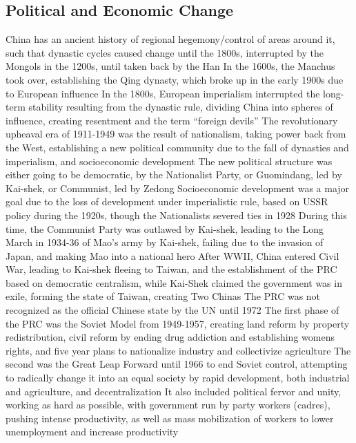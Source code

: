 \documentclass[11 pt, twoside]{article}
\newenvironment{outline*}
{
	\begin{outline}[enumerate]
	}
	{\end{outline}
}
\begin{document}
\subsection{Political and Economic Change}
\begin{outline*}
\1 China has an ancient history of regional hegemony/control of areas around it, such that dynastic cycles caused change until the 1800s, interrupted by the Mongols in the 1200s, until taken back by the Han
\2 In the 1600s, the Manchus took over, establishing the Qing dynasty, which broke up in the early 1900s due to European influence
\1 In the 1800s, European imperialism interrupted the long-term stability resulting from the dynastic rule, dividing China into spheres of influence, creating resentment and the term ``foreign devils''
\1 The revolutionary upheaval era of 1911-1949 was the result of nationalism, taking power back from the West, establishing a new political community due to the fall of dynasties and imperialism, and socioeconomic development
\2 The new political structure was either going to be democratic, by the Nationalist Party, or Guomindang, led by Kai-shek, or Communist, led by Zedong
\2 Socioeconomic development was a major goal due to the loss of development under imperialistic rule, based on USSR policy during the 1920s, though the Nationalists severed ties in 1928
\2 During this time, the Communist Party was outlawed by Kai-shek, leading to the Long March in 1934-36 of Mao's army by Kai-shek, failing due to the invasion of Japan, and making Mao into a national hero
\1 After WWII, China entered Civil War, leading to Kai-shek fleeing to Taiwan, and the establishment of the PRC based on democratic centralism, while Kai-Shek claimed the government was in exile, forming the state of Taiwan, creating Two Chinas
\2 The PRC was not recognized as the official Chinese state by the UN until 1972
\2 The first phase of the PRC was the Soviet Model from 1949-1957, creating land reform by property redistribution, civil reform by ending drug addiction and establishing womens rights, and five year plans to nationalize industry and collectivize agriculture
\2 The second was the Great Leap Forward until 1966 to end Soviet control, attempting to radically change it into an equal society by rapid development, both industrial and agriculture, and decentralization
\3 It also included political fervor and unity, working as hard as possible, with government run by party workers (cadres), pushing intense productivity, as well as mass mobilization of workers to lower unemployment and increase productivity

\end{outline*}
\end{document}
